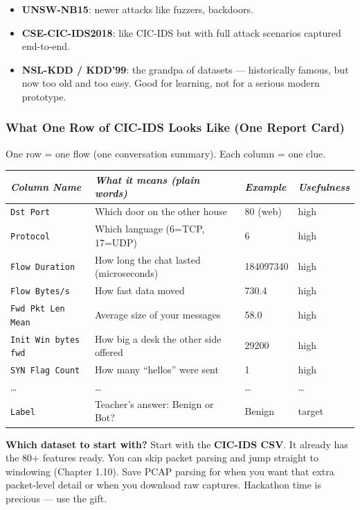 \documentclass[11pt,a4paper]{article}
\begin{document}
\begin{itemize}[leftmargin=1.6em,itemsep=2pt]
  \item \textbf{UNSW-NB15}: newer attacks like fuzzers, backdoors.
  \item \textbf{CSE-CIC-IDS2018}: like CIC-IDS but with full attack scenarios
        captured end-to-end.
  \item \textbf{NSL-KDD / KDD'99}: the grandpa of datasets --- historically
        famous, but now too old and too easy. Good for learning, not for a
        serious modern prototype.
\end{itemize}

\subsubsection{What One Row of CIC-IDS Looks Like (One Report Card)}

One row = one flow (one conversation summary). Each column = one clue.

\begin{center}
\small
\begin{tabular}{@{}llll@{}}
\toprule
\emph{Column Name} & \emph{What it means (plain words)} & \emph{Example} & \emph{Usefulness} \\
\midrule
\texttt{Dst Port} & Which door on the other house & 80 (web) & high \\
\texttt{Protocol} & Which language (6=TCP, 17=UDP) & 6 & high \\
\texttt{Flow Duration} & How long the chat lasted (microseconds) & 184097340 & high \\
\texttt{Flow Bytes/s} & How fast data moved & 730.4 & high \\
\texttt{Fwd Pkt Len Mean} & Average size of your messages & 58.0 & high \\
\texttt{Init Win bytes fwd} & How big a desk the other side offered & 29200 & high \\
\texttt{SYN Flag Count} & How many ``hellos'' were sent & 1 & high \\
\dots & \dots & \dots & \dots \\
\texttt{Label} & Teacher's answer: Benign or Bot? & Benign & target \\
\bottomrule
\end{tabular}
\end{center}

\begin{tipbox}
\textbf{Which dataset to start with?} Start with the \textbf{CIC-IDS CSV}.
It already has the 80+ features ready. You can skip packet parsing and jump
straight to windowing (Chapter 1.10). Save PCAP parsing for when you want that
extra packet-level detail or when you download raw captures. Hackathon time is
precious --- use the gift.
\end{tipbox}
\end{document}
